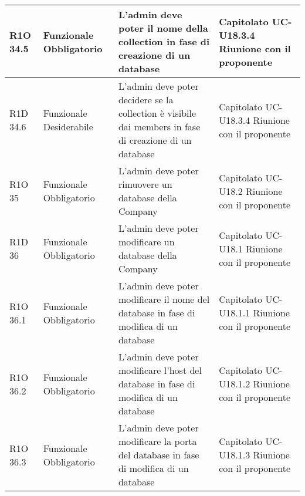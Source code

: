 \begin{center}
\begin{longtable}{ | l | p{2cm} | p{4.7cm} | p{2.5cm} |}
    R1O 34.5 & Funzionale \newline Obbligatorio & L'admin deve poter il nome della collection in fase di creazione di un database & Capitolato \newline UC-U18.3.4 \newline Riunione con il proponente \\ \hline
    
    R1D 34.6 & Funzionale \newline Desiderabile & L'admin deve poter decidere se la collection è visibile dai members in fase di creazione di un database & Capitolato \newline UC-U18.3.4 \newline Riunione con il proponente \\ \hline
    
    R1O 35 & Funzionale \newline Obbligatorio & L'admin deve poter rimuovere un database della Company & Capitolato \newline UC-U18.2 \newline Riunione con il proponente \\ \hline
    
    R1D 36 & Funzionale \newline Obbligatorio & L'admin deve poter modificare un database della Company & Capitolato \newline UC-U18.1 \newline Riunione con il proponente \\ \hline
        
    R1O 36.1 & Funzionale \newline Obbligatorio & L'admin deve poter modificare il nome del database in fase di modifica di un database & Capitolato \newline UC-U18.1.1 \newline Riunione con il proponente \\ \hline
	      	
   	R1O 36.2 & Funzionale \newline Obbligatorio & L'admin deve poter modificare l'host del database in fase di modifica di un database & Capitolato \newline UC-U18.1.2 \newline Riunione con il proponente \\ \hline
   	
   	R1O 36.3 & Funzionale \newline Obbligatorio & L'admin deve poter modificare la porta del database in fase di modifica di un database & Capitolato \newline UC-U18.1.3 \newline Riunione con il proponente \\ \hline
	    	

\end{longtable}
\end{center}
